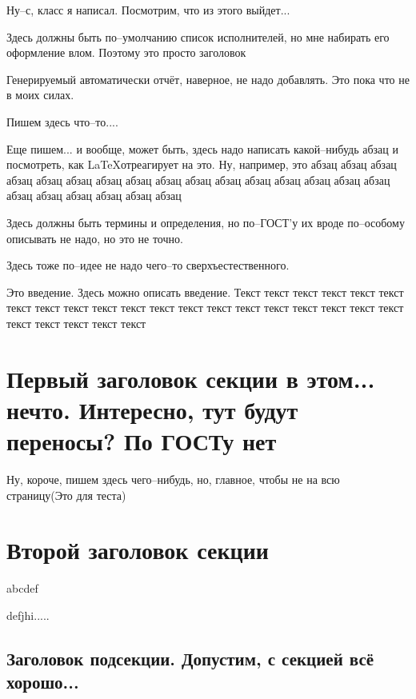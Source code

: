 \documentclass{article}
\begin{document}
{\Huge
Ну--с, класс я написал. Посмотрим, что из этого выйдет...

}


\Executors

Здесь должны быть по--умолчанию список исполнителей, но мне набирать его оформление влом. Поэтому это просто заголовок

\Repherat

Генерируемый автоматически отчёт, наверное, не надо добавлять. Это пока что не в моих силах.

Пишем здесь что--то....

Еще пишем... и вообще, может быть, здесь надо написать какой--нибудь абзац и посмотреть, как \LaTeX отреагирует на это. Ну, например, это абзац  абзац абзац абзац абзац абзац абзац абзац абзац абзац абзац абзац абзац абзац абзац абзац абзац абзац абзац абзац абзац абзац

\newpage

\tableofcontents

\TermAndDefine

Здесь должны быть термины и определения, но по--ГОСТ'у их вроде по--особому описывать не надо, но это не точно.

\listAbbreviationAndNotation

Здесь тоже по--идее не надо чего--то сверхъестественного.

\Intoduction

Это введение. Здесь можно описать введение. Текст текст текст текст текст текст текст текст текст текст текст текст текст текст текст текст текст текст текст текст текст текст текст текст текст

\section{Первый заголовок секции в этом... нечто. Интересно, тут будут переносы? По ГОСТу нет}

Ну, короче, пишем здесь чего--нибудь, но, главное, чтобы не на всю страницу(Это для теста)

\section{Второй заголовок секции}

abcdef 

defjhi.....

\subsection{Заголовок подсекции. Допустим, с секцией всё хорошо...}
\end{document}
